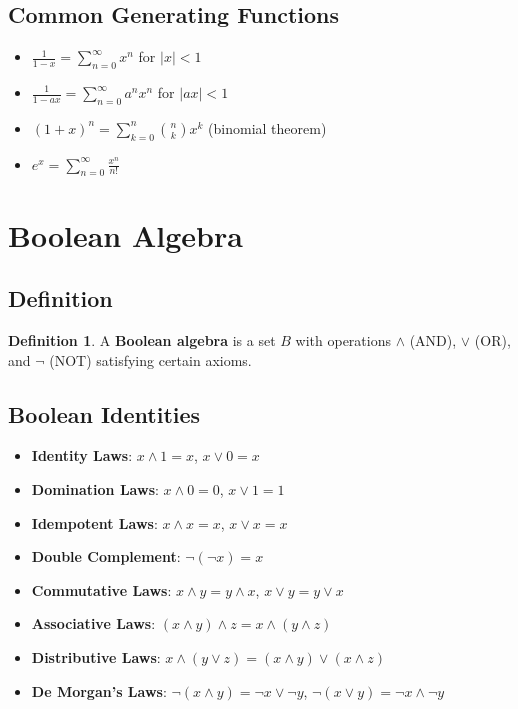 \documentclass[11pt]{article}
\theoremstyle{definition}
\newtheorem{definition}{Definition}[section]
\begin{document}
\subsection{Common Generating Functions}
\begin{itemize}
    \item $\frac{1}{1-x} = \sum_{n=0}^{\infty} x^n$ for $|x| < 1$
    \item $\frac{1}{1-ax} = \sum_{n=0}^{\infty} a^n x^n$ for $|ax| < 1$
    \item $(1+x)^n = \sum_{k=0}^{n} \binom{n}{k} x^k$ (binomial theorem)
    \item $e^x = \sum_{n=0}^{\infty} \frac{x^n}{n!}$
\end{itemize}

\section{Boolean Algebra}

\subsection{Definition}
\begin{definition}
A \textbf{Boolean algebra} is a set $B$ with operations $\land$ (AND), $\lor$ (OR), and $\neg$ (NOT) satisfying certain axioms.
\end{definition}

\subsection{Boolean Identities}
\begin{itemize}
    \item \textbf{Identity Laws}: $x \land 1 = x$, $x \lor 0 = x$
    \item \textbf{Domination Laws}: $x \land 0 = 0$, $x \lor 1 = 1$
    \item \textbf{Idempotent Laws}: $x \land x = x$, $x \lor x = x$
    \item \textbf{Double Complement}: $\neg(\neg x) = x$
    \item \textbf{Commutative Laws}: $x \land y = y \land x$, $x \lor y = y \lor x$
    \item \textbf{Associative Laws}: $(x \land y) \land z = x \land (y \land z)$
    \item \textbf{Distributive Laws}: $x \land (y \lor z) = (x \land y) \lor (x \land z)$
    \item \textbf{De Morgan's Laws}: $\neg(x \land y) = \neg x \lor \neg y$, $\neg(x \lor y) = \neg x \land \neg y$
\end{itemize}
\end{document}
